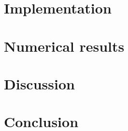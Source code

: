 \documentclass[twoside,onecolumn]{article}
\begin{document}


\section{Implementation}



\section{Numerical results}



\section{Discussion}




\section{Conclusion}






\end{document}

